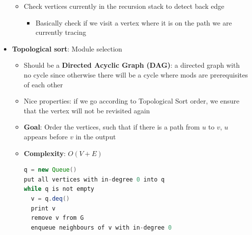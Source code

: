 \documentclass{article}
\begin{document}
\begin{multicols}{2}
\begin{itemize}
\begin{itemize}
    	\item Check vertices currently in the recursion stack to detect back edge
    	\begin{itemize}
    		\item Basically check if we visit a vertex where it is on the path we are currently tracing
    	\end{itemize}
    \end{itemize}
	\item \textbf{Topological sort}: Module selection
	\begin{itemize}
		\item Should be a \textbf{Directed Acyclic Graph (DAG)}: a directed graph with no cycle since otherwise there will be a cycle where mods are prerequisites of each other
		\item Nice properties: if we go according to Topological Sort order, we ensure that the vertex will not be revisited again
		\item \textbf{Goal}: Order the vertices, such that if there is a path from $u$ to $v$, $u$ appears before $v$ in the output
		\item \textbf{Complexity}: $O(V+E)$
		\begin{lstlisting}[language=Java]
q = new Queue()
put all vertices with in-degree 0 into q
while q is not empty
  v = q.deq()
  print v
  remove v from G
  enqueue neighbours of v with in-degree 0\end{lstlisting}
	\end{itemize}
\end{itemize}


\end{multicols}
\end{document}
